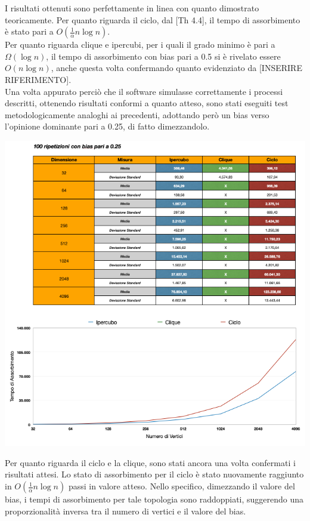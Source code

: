 \documentclass{article}
\begin{document}
I risultati ottenuti sono perfettamente in linea con quanto dimostrato teoricamente. Per quanto riguarda il ciclo, dal [Th 4.4], il tempo di assorbimento è stato pari a $O(\frac{1}{\alpha}n\log{}n)$. \\
Per quanto riguarda clique e ipercubi, per i quali il grado minimo è pari a $\Omega(\log{}n)$, il tempo di assorbimento con bias pari a 0.5 si è rivelato essere $O(n\log{}n)$, anche questa volta confermando quanto evidenziato da [INSERIRE RIFERIMENTO].\\
Una volta appurato perciò che il software simulasse correttamente i processi descritti, ottenendo risultati conformi a quanto atteso, sono stati eseguiti test metodologicamente analoghi ai precedenti, adottando però un bias verso l'opinione dominante pari a 0.25, di fatto dimezzandolo.\\
\begin{center}
\includegraphics[width=1\textwidth]{test_bias025.png}
\end{center}
Per quanto riguarda il ciclo e la clique, sono stati ancora una volta confermati i risultati attesi.
Lo stato di assorbimento per il ciclo è stato nuovamente raggiunto in $O(\frac{1}{\alpha}n\log{}n)$ passi in valore atteso. Nello specifico, dimezzando il valore del bias, i tempi di assorbimento per tale topologia sono raddoppiati, suggerendo una proporzionalità inversa tra il numero di vertici e il valore del bias.\\
\end{document}
